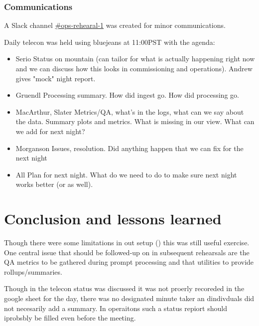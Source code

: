 \subsubsection{Communications }


A Slack channel \href{https://lsstc.slack.com/messages/CJBSY6FUN}{\#ops-rehearal-1}  was created
for minor communications.

Daily telecon was held using bluejeans at 11:00PST with the agenda:
\begin{itemize}
\item Serio	Status on mountain (can tailor for what is actually happening right now and we can discuss how this looks in commissioning and operations). Andrew gives "mock" night report.
\item Gruendl 	Processing summary. How did ingest go. How did processing go.
\item MacArthur, Slater	Metrics/QA, what's in the logs, what can we say about the data. Summary plots and metrics. What is missing in our view. What can we add for next night?
\item Morganson	Issues, resolution. Did anything happen that we can fix for the next night

\item All	Plan for next night. What do we need to do to make sure next night works better (or as well).
\end{itemize}







\section{Conclusion and lessons learned}\label{sec:conc}
Though there were some limitations in out setup () this was still useful exercise.
One central issue that should be followed-up on in subsequent rehearsals are the \gls{QA} metrics to be gathered during prompt processing and that utilities to provide rollups/summaries.

Though in the telecon status was discussed it was not proerly recoreded in the google sheet for the day,
there was no designated minute taker an dindivduals did not necesarily add a summary. In operaitons such a status
repiort should iprobsbly be filled even before the meeting.



